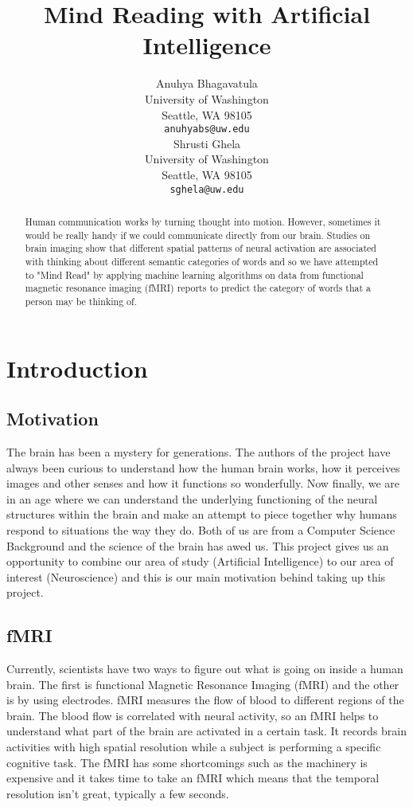 \documentclass{article}
\title{Mind Reading with Artificial Intelligence}
\author{
  Anuhya Bhagavatula \\
  University of Washington \\
  Seattle, WA 98105 \\
  \texttt{anuhyabs@uw.edu} \\
  \And
  Shrusti Ghela \\
  University of Washington \\
  Seattle, WA 98105 \\
  \texttt{sghela@uw.edu} \\
}
\begin{document}
\maketitle

\begin{abstract}
  Human communication works by turning thought into motion. However, sometimes it would be really handy if we could communicate directly from our brain.
  Studies on brain imaging show that different spatial patterns of neural activation are associated with thinking about different semantic categories of
  words and so we have attempted to "Mind Read" by applying machine learning algorithms on data from functional magnetic resonance imaging (fMRI) reports
  to predict the category of words that a person may be thinking of.
\end{abstract}

\section{Introduction}

\subsection{Motivation}

The brain has been a mystery for generations. The authors of the project have 
always been curious to understand how the human brain works, how it perceives 
images and other senses and how it functions so wonderfully. Now finally, we are 
in an age where we can understand the underlying functioning of the neural structures 
within the brain and make an attempt to piece together why humans respond to 
situations the way they do. Both of us are from a Computer Science Background 
and the science of the brain has awed us. This project gives us an opportunity 
to combine our area of study (Artificial Intelligence) to our area of interest 
(Neuroscience) and this is our main motivation behind taking up this project.

\subsection{fMRI}

Currently, scientists have two ways to figure out what is going on inside a human brain. 
The first is functional Magnetic Resonance Imaging (fMRI) and the other is by using electrodes.
fMRI measures the flow of blood to different regions of the brain. The blood flow is 
correlated with neural activity, so an fMRI helps to understand what part of the brain 
are activated in a certain task. It records brain activities with high spatial resolution while a 
subject is performing a specific cognitive task. The fMRI has some shortcomings such as the machinery 
is expensive and it takes time to take an fMRI which means that the temporal resolution isn't great, 
typically a few seconds.
\end{document}
